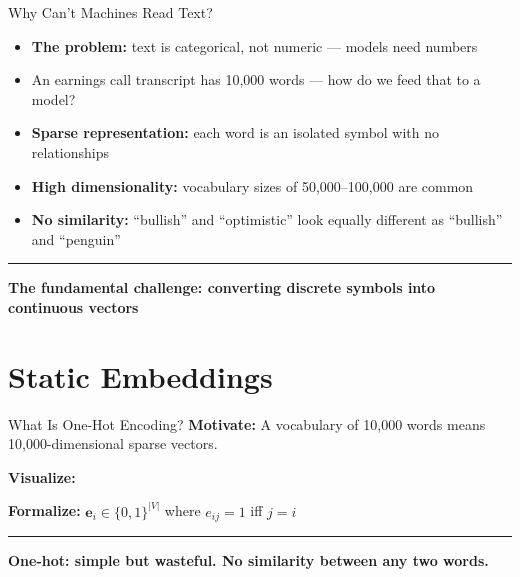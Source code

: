 \documentclass[8pt,aspectratio=169]{beamer}
\newcommand{\bottomnote}[1]{%
\vfill
\vspace{-2mm}
\textcolor{mllavender2}{\rule{\textwidth}{0.4pt}}
\vspace{1mm}
\footnotesize
\textbf{#1}
}
\newenvironment{compactlist}{%
  \begin{itemize}%
    \setlength{\itemsep}{2pt}%
    \setlength{\parskip}{0pt}%
    \setlength{\parsep}{0pt}%
}{%
  \end{itemize}%
}
\newcommand{\highlight}[1]{\textcolor{mlorange}{\textbf{#1}}}
\begin{document}
\begin{frame}{Why Can't Machines Read Text?}
\begin{compactlist}
\item \highlight{The problem:} text is categorical, not numeric --- models need numbers
\item An earnings call transcript has 10,000 words --- how do we feed that to a model?
\item \textbf{Sparse representation:} each word is an isolated symbol with no relationships
\item \textbf{High dimensionality:} vocabulary sizes of 50,000--100,000 are common
\item \textbf{No similarity:} ``bullish'' and ``optimistic'' look equally different as ``bullish'' and ``penguin''
\end{compactlist}
\bottomnote{The fundamental challenge: converting discrete symbols into continuous vectors}
\end{frame}

\section{Static Embeddings}

\begin{frame}{What Is One-Hot Encoding?}
\textbf{Motivate:} A vocabulary of 10,000 words means 10,000-dimensional sparse vectors.

\vspace{2mm}
\textbf{Visualize:}
\begin{center}
\end{center}

\textbf{Formalize:} $\mathbf{e}_i \in \{0,1\}^{|V|}$ where $e_{ij} = 1$ iff $j = i$
\bottomnote{One-hot: simple but wasteful. No similarity between any two words.}
\end{frame}
\end{document}
